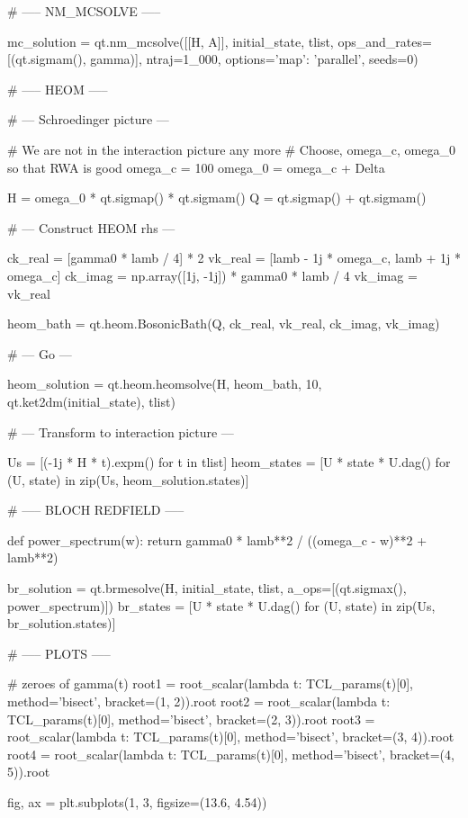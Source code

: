 # ----- NM_MCSOLVE -----

mc_solution = qt.nm_mcsolve([[H, A]], initial_state, tlist,
                            ops_and_rates=[(qt.sigmam(), gamma)],
                            ntraj=1_000, options={'map': 'parallel'}, seeds=0)



# ----- HEOM -----

# --- Schroedinger picture ---

# We are not in the interaction picture any more
# Choose, omega_c, omega_0 so that RWA is good
omega_c = 100
omega_0 = omega_c + Delta

H = omega_0 * qt.sigmap() * qt.sigmam()
Q = qt.sigmap() + qt.sigmam()

# --- Construct HEOM rhs ---

ck_real = [gamma0 * lamb / 4] * 2
vk_real = [lamb - 1j * omega_c, lamb + 1j * omega_c]
ck_imag = np.array([1j, -1j]) * gamma0 * lamb / 4
vk_imag = vk_real

heom_bath = qt.heom.BosonicBath(Q, ck_real, vk_real, ck_imag, vk_imag)

# --- Go ---

heom_solution = qt.heom.heomsolve(H, heom_bath, 10, qt.ket2dm(initial_state), tlist)

# --- Transform to interaction picture ---

Us = [(-1j * H * t).expm() for t in tlist]
heom_states = [U * state * U.dag() for (U, state) in zip(Us, heom_solution.states)]



# ----- BLOCH REDFIELD -----

def power_spectrum(w):
    return gamma0 * lamb**2 / ((omega_c - w)**2 + lamb**2)

br_solution = qt.brmesolve(H, initial_state, tlist, a_ops=[(qt.sigmax(), power_spectrum)])
br_states = [U * state * U.dag() for (U, state) in zip(Us, br_solution.states)]



# ----- PLOTS -----

# zeroes of gamma(t)
root1 = root_scalar(lambda t: TCL_params(t)[0], method='bisect', bracket=(1, 2)).root
root2 = root_scalar(lambda t: TCL_params(t)[0], method='bisect', bracket=(2, 3)).root
root3 = root_scalar(lambda t: TCL_params(t)[0], method='bisect', bracket=(3, 4)).root
root4 = root_scalar(lambda t: TCL_params(t)[0], method='bisect', bracket=(4, 5)).root

fig, ax = plt.subplots(1, 3, figsize=(13.6, 4.54))

